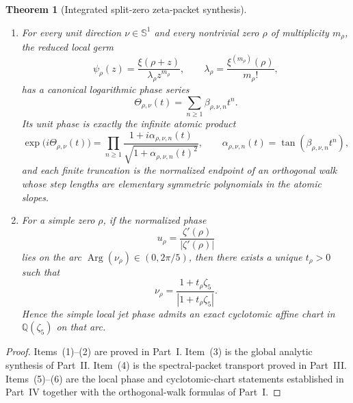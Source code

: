 \documentclass[11pt,a4paper]{article}
\numberwithin{equation}{section}
\newtheorem{theorem}{Theorem}[section]
\theoremstyle{definition}
\theoremstyle{remark}
\DeclareMathOperator{\Arg}{Arg}
\newcommand{\QQ}{\mathbb Q}
\begin{document}
\begin{theorem}[Integrated split-zero zeta-packet synthesis]
\begin{enumerate}[label=(\arabic*)]
\item For every unit direction $\nu\in\mathbb S^1$ and every nontrivial zero $\rho$ of multiplicity $m_\rho$, the reduced local germ
\[
\psi_\rho(z)=\frac{\xi(\rho+z)}{\lambda_\rho z^{m_\rho}},
\qquad
\lambda_\rho=\frac{\xi^{(m_\rho)}(\rho)}{m_\rho!},
\]
has a canonical logarithmic phase series
\[
\Theta_{\rho,\nu}(t)=\sum_{n\ge 1}\beta_{\rho,\nu,n}t^n.
\]
Its unit phase is exactly the infinite atomic product
\[
\exp\bigl(i\Theta_{\rho,\nu}(t)\bigr)
=
\prod_{n\ge 1}
\frac{1+i\alpha_{\rho,\nu,n}(t)}{\sqrt{1+\alpha_{\rho,\nu,n}(t)^2}},
\qquad
\alpha_{\rho,\nu,n}(t)=\tan(\beta_{\rho,\nu,n}t^n),
\]
and each finite truncation is the normalized endpoint of an orthogonal walk whose step lengths are elementary symmetric polynomials in the atomic slopes.

\item For a simple zero $\rho$, if the normalized phase
\[
u_\rho=\frac{\zeta'(\rho)}{|\zeta'(\rho)|}
\]
lies on the arc $\Arg(\nu_\rho)\in(0,2\pi/5)$, then there exists a unique $t_\rho>0$ such that
\[
\nu_\rho=\frac{1+t_\rho\zeta_5}{|1+t_\rho\zeta_5|}.
\]
Hence the simple local jet phase admits an exact cyclotomic affine chart in $\QQ(\zeta_5)$ on that arc.
\end{enumerate}
\end{theorem}

\begin{proof}
Items~(1)--(2) are proved in Part~I.  Item~(3) is the global analytic synthesis of Part~II.  Item~(4) is the spectral-packet transport proved in Part~III.  Items~(5)--(6) are the local phase and cyclotomic-chart statements established in Part~IV together with the orthogonal-walk formulas of Part~I.
\end{proof}
\end{document}
